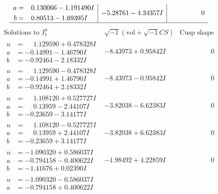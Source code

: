 \documentclass[1p]{elsarticle_modified}
\theoremstyle{definition}
\newcommand{\I}{\sqrt{-1}}
\begin{document}
$$\begin{array}{c|c|c}
\begin{aligned}
a &= \phantom{-}0.130066 - 1.191490 I \\
b &= \phantom{-}0.80513 - 1.69395 I\end{aligned}
 & -5.28761 - 4.34357 I & \phantom{-0.000000 } 0\\
 \hline 
 \end{array}$$\newpage$$\begin{array}{c|c|c}  
\text{Solutions to }I^u_{1}& \I (\text{vol} + \sqrt{-1}CS) & \text{Cusp shape}\\
 \hline 
\begin{aligned}
u &= \phantom{-}1.129590 + 0.478328 I \\
a &= -0.14991 - 1.46790 I \\
b &= -0.92464 - 2.18332 I\end{aligned}
 & -8.43973 + 0.95842 I & \phantom{-0.000000 } 0 \\ \hline\begin{aligned}
u &= \phantom{-}1.129590 - 0.478328 I \\
a &= -0.14991 + 1.46790 I \\
b &= -0.92464 + 2.18332 I\end{aligned}
 & -8.43973 - 0.95842 I & \phantom{-0.000000 } 0 \\ \hline\begin{aligned}
u &= \phantom{-}1.108120 + 0.527727 I \\
a &= \phantom{-}0.13959 - 2.44107 I \\
b &= -0.23659 - 3.14177 I\end{aligned}
 & -3.82038 - 6.62383 I & \phantom{-0.000000 } 0 \\ \hline\begin{aligned}
u &= \phantom{-}1.108120 - 0.527727 I \\
a &= \phantom{-}0.13959 + 2.44107 I \\
b &= -0.23659 + 3.14177 I\end{aligned}
 & -3.82038 + 6.62383 I & \phantom{-0.000000 } 0 \\ \hline\begin{aligned}
u &= -1.090320 + 0.586037 I \\
a &= -0.794158 - 0.400622 I \\
b &= -1.41676 + 0.02390 I\end{aligned}
 & -1.98492 + 4.22859 I & \phantom{-0.000000 } 0 \\ \hline\begin{aligned}
u &= -1.090320 - 0.586037 I \\
a &= -0.794158 + 0.400622 I \\

\end{aligned}
\end{array}$$
\end{document}
